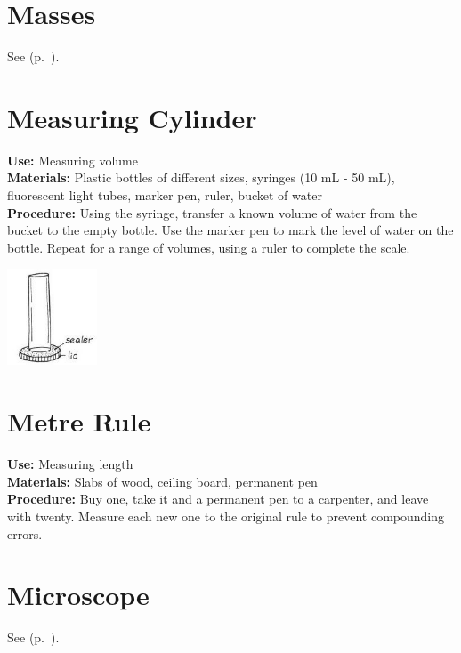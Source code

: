 \begin{multicols}{2}
\section{Masses}
\label{sec:masses}
See  (p.~\pageref{sec:weights}).

\section{Measuring Cylinder}
\label{sec:meascyl}
\vspace{-10pt}
\textbf{Use:} Measuring volume\\
\textbf{Materials:} Plastic bottles of different sizes, syringes (10 mL - 50 mL), fluorescent light tubes, marker pen, ruler, bucket of water\\
\textbf{Procedure:} Using the syringe, transfer a known volume of water from the bucket to the empty bottle. Use the marker pen to mark the level of water on the bottle. Repeat for a range of volumes, using a ruler to complete the scale. 
\begin{center}
\includegraphics[width=0.2\textwidth]{./img/vso/meas-cyl.jpg}
\end{center}

\section{Metre Rule}
\label{sec:meter-rule}
\vspace{-10pt}
\textbf{Use:} Measuring length\\
\textbf{Materials:} Slabs of wood, ceiling board, permanent pen\\
\textbf{Procedure:} Buy one, take it and a permanent pen to a carpenter, and leave with twenty. Measure each new one to the original rule to prevent compounding errors.

\section{Microscope}
\label{sec:microscope}
See  (p.~\pageref{cha:microscopy}).


\end{multicols}

